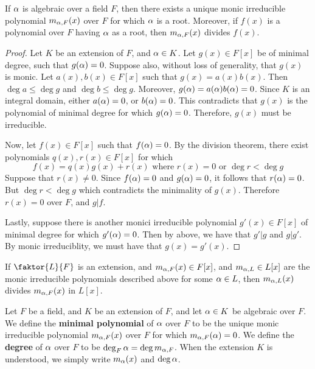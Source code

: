 \begin{proposition}\label{proposition_8.2.2}
  If $\alpha$ is algebraic over a field $F$, then there exists a unique
  monic irreducible polynomial $m_{\alpha,F}(x)$ over $F$ for which $\alpha$
  is a root. Moreover, if $f(x)$ is a polynomial over $F$ having $\alpha$ as
  a root, then $m_{\alpha,F}(x)$ divides $f(x)$.
\end{proposition}
\begin{proof}
  Let $K$ be an extension of $F$, and $\alpha \in K$. Let $g(x) \in F[x]$
  be of minimal degree, such that $g(\alpha)=0$. Suppose also, without
  loss of generality, that $g(x)$ is monic. Let $a(x),b(x) \in F[x]$
  such that $g(x)=a(x)b(x)$. Then $\deg{a} \leq \deg{g}$ and
  $\deg{b} \leq \deg{g}$. Moreover, $g(\alpha)=a(\alpha)b(\alpha)=0$. Since $K$
  is an integral domain, either $a(\alpha)=0$, or $b(\alpha)=0$. This
  contradicts that $g(x)$ is the polynomial of minimal degree for
  which $g(\alpha)=0$. Therefore, $g(x)$ must be irreducible.

  Now, let $f(x) \in F[x]$ such that $f(\alpha)=0$. By the division
  theorem, there exist polynomials $q(x),r(x) \in F[x]$ for which
  \begin{equation*}
    f(x)=q(x)g(x)+r(x) \text{ where } r(x)=0 \text{ or }
    \deg{r}<\deg{g}
  \end{equation*}
  Suppose that $r(x) \neq 0$. Since $f(\alpha)=0$ and $g(\alpha)=0$, it
  follows that $r(\alpha)=0$. But $\deg{r}<\deg{g}$ which contradicts the
  minimality of $g(x)$. Therefore $r(x)=0$ over $F$, and  $g|f$.

  Lastly, suppose there is another monici irreducible polynomial
  $g'(x) \in F[x]$ of minimal degree for which $g'(\alpha)=0$. Then by
  above, we have that $g'|g$ and $g|g'$. By monic irreduciblity, we
  must have that  $g(x)=g'(x)$.
\end{proof}
\begin{corollary}
  If $\faktor{L}{F}$ is an extension, and  $m_{\alpha,F}(x) \in F[x]$, and
  $m_{\alpha,L} \in L[x]$ are the monic irreducible polynomials described
  above for some $\alpha \in L$, then $m_{\alpha,L}(x)$ divides $m_{\alpha,F}(x)$
  in $L[x]$.
\end{corollary}

\begin{definition}
  Let $F$ be a field, and $K$ be an extension of $F$, and let $\alpha \in
  K$ be algebraic over $F$. We define the \textbf{minimal polynomial}
  of $\alpha$ over $F$ to be the unique monic irreducible polynomial
  $m_{\alpha,F}(x)$ over $F$ for which  $m_{\alpha,F}(\alpha)=0$. We define the
  \textbf{degree} of $\alpha$ over $F$ to be $\deg_F{\alpha}=\deg{m_{\alpha,F}}$.
  When the extension $K$ is understood, we simply write $m_\alpha(x)$ and
  $\deg{\alpha}$.
\end{definition}

